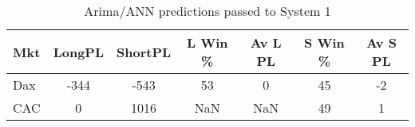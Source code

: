 \begin{table}[ht]
\centering
\caption[Arima/ANN predictions passed to System 1.]{Arima/ANN predictions passed to System 1} 
\label{tab:chp_ts:arima_ann_sys1}
\begin{tabular}{lcccccc}
  \toprule Mkt & LongPL & ShortPL & L Win \% & Av L PL & S Win \% & Av S PL \\ 
  \midrule Dax & -344 & -543 & 53 & 0 & 45 & -2 \\ 
  CAC & 0 & 1016 & NaN & NaN & 49 & 1 \\ 
   \bottomrule \end{tabular}
\end{table}
